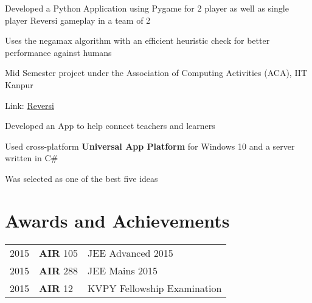 \documentclass[]{deedy-resume-openfont}
\begin{document}
\begin{minipage}[t]{0.66\textwidth}
\begin{tightemize}
  \item Developed a Python Application using Pygame for 2 player as well as
    single player Reversi gameplay in a team of 2
  \item Uses the negamax algorithm with an efficient heuristic check
    for better performance against humans
  \item Mid Semester project under the Association of Computing Activities (ACA), IIT Kanpur
  \item Link: \href{http://github.com/yashsriv/Reversi-Python}{Reversi}
\end{tightemize}

\begin{tightemize}
  \item Developed an App to help connect teachers and learners
  \item Used cross-platform \textbf{Universal App Platform} for Windows 10
    and a server written in C\#
  \item Was selected as one of the best five ideas
\end{tightemize}


\section{Awards and Achievements} 
\begin{tabular}{rll}
  2015	   & \textbf{AIR} 105 & JEE Advanced 2015\\
  2015	   & \textbf{AIR} 288 & JEE Mains 2015\\
  2015	   & \textbf{AIR} 12  & KVPY Fellowship Examination\\
\end{tabular}



\end{minipage}
\end{document}

